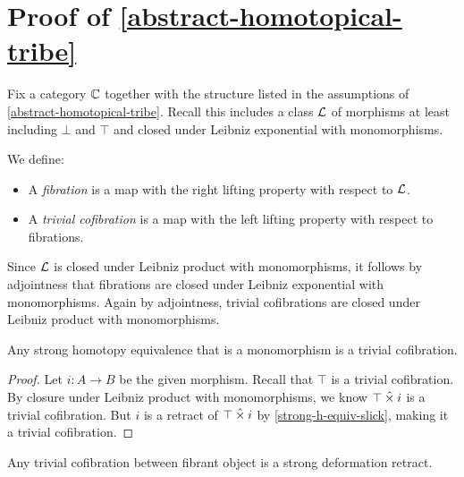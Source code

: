 \documentclass[reqno,10pt,a4paper,oneside]{amsart}
\begin{document}
\section{Proof of \cref{abstract-homotopical-tribe}}

Fix a category $\mathbb{C}$ together with the structure listed in the assumptions of \cref{abstract-homotopical-tribe}.
Recall this includes a class $\mathcal{L}$ of morphisms at least including $\bot$ and $\top$ and closed under Leibniz exponential with monomorphisms.

\begin{definition}
\label{def:constructive-kan}
We define:
\begin{itemize}
\item
A \emph{fibration} is a map with the right lifting property with respect to $\mathcal{L}$.
\item
A \emph{trivial cofibration} is a map with the left lifting property with respect to fibrations.
\end{itemize}
\end{definition}

Since $\mathcal{L}$ is closed under Leibniz product with monomorphisms, it follows by adjointness that fibrations are closed under Leibniz exponential with monomorphisms.
Again by adjointness, trivial cofibrations are closed under Leibniz product with monomorphisms.

\begin{lemma}
\label{strong-h-equiv-mono-is-anodyne}
Any strong homotopy equivalence that is a monomorphism is a trivial cofibration.
\end{lemma}

\begin{proof}
Let $i : A \to B$ be the given morphism.
Recall that $\top$ is a trivial cofibration.
By closure under Leibniz product with monomorphisms, we know $\top \mathbin{\hat{\times}} i$ is a trivial cofibration.
But $i$ is a retract of $\top \mathbin{\hat{\times}} i$ by \cref{strong-h-equiv-slick}, making it a trivial cofibration.
\end{proof}

\begin{lemma}
\label{anodyne-between-fibrant-is-strong-def-retract}
Any trivial cofibration between fibrant object is a strong deformation retract.
\end{lemma}
\end{document}
